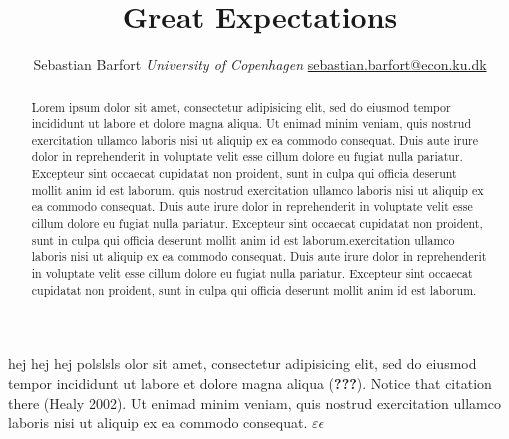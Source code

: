\documentclass[11pt,article,oneside]{memoir}
\title{Great Expectations}
\author{\Large Sebastian Barfort\vspace{0.05in} \newline\normalsize\emph{University of Copenhagen} \newline\footnotesize \url{sebastian.barfort@econ.ku.dk}\vspace*{0.2in}\newline }
\date{ \vspace{-0.7in}}
\begin{document}
  



\pagestyle{kjh}


\maketitle



\begin{abstract}

Lorem ipsum dolor sit amet, consectetur adipisicing elit, sed do eiusmod
tempor incididunt ut labore et dolore magna aliqua. Ut enimad minim
veniam, quis nostrud exercitation ullamco laboris nisi ut aliquip ex ea
commodo consequat. Duis aute irure dolor in reprehenderit in voluptate
velit esse cillum dolore eu fugiat nulla pariatur. Excepteur sint
occaecat cupidatat non proident, sunt in culpa qui officia deserunt
mollit anim id est laborum. quis nostrud exercitation ullamco laboris
nisi ut aliquip ex ea commodo consequat. Duis aute irure dolor in
reprehenderit in voluptate velit esse cillum dolore eu fugiat nulla
pariatur. Excepteur sint occaecat cupidatat non proident, sunt in culpa
qui officia deserunt mollit anim id est laborum.exercitation ullamco
laboris nisi ut aliquip ex ea commodo consequat. Duis aute irure dolor
in reprehenderit in voluptate velit esse cillum dolore eu fugiat nulla
pariatur. Excepteur sint occaecat cupidatat non proident, sunt in culpa
qui officia deserunt mollit anim id est laborum.

\end{abstract}


\section{}\label{section}

hej hej hej polslsls olor sit amet, consectetur adipisicing elit, sed do
eiusmod tempor incididunt ut labore et dolore magna aliqua
({\textbf{???}}). Notice that citation there (Healy 2002). Ut enimad
minim veniam, quis nostrud exercitation ullamco laboris nisi ut aliquip
ex ea commodo consequat. $\varepsilon \epsilon$
\end{document}
